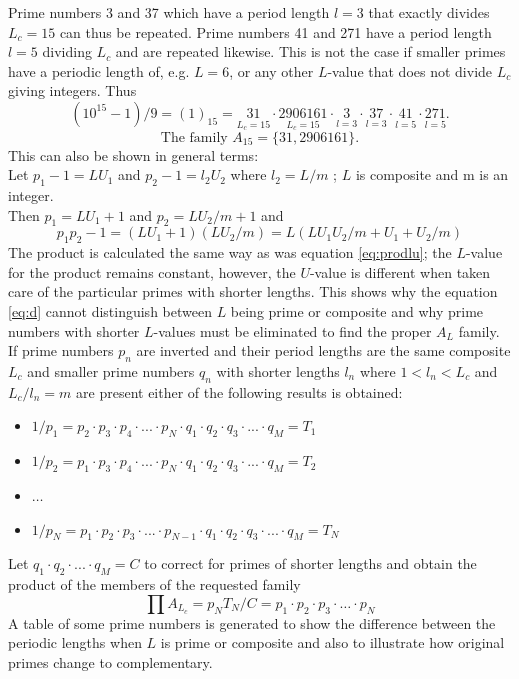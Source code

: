 \documentclass[10pt,twoside,a4paper]{amsart}
\begin{document}
Prime numbers 3 and 37 which have a period length $l = 3$ that exactly divides $L_{c} = 15$ can thus be repeated. Prime numbers 41 and 271 have a period length $l = 5$ dividing $L_{c}$ and are repeated likewise. This is not the case if smaller primes have a periodic length of, e.g. $L = 6$, or any other $L$-value that does not divide $L_{c}$ giving integers. Thus
\begin{equation*}
(10^{15}-1)/9 = (1)_{15} = \underset{L_{c}=15}{31} \cdot \underset{L_{c}=15}{2906161} \cdot \underset{l=3}{3} \cdot \underset{l=3}{37} \cdot \underset{l=5}{41} \cdot \underset{l=5}{271}.
\end{equation*}
\begin{equation*}
\text{The family } A_{15} = \{31, 2906161\}.
\end{equation*}
This can also be shown in general terms:\\
Let $p_{1}-1 = LU_{1}$ and $p_{2}-1 = l_{2}U_{2}$ where $l_{2} = L/m$ ; $L$ is composite and m is an integer.\\
Then $p_{1} = LU_{1}+1$ and $p_{2} = LU_{2}/m + 1$ and
\begin{equation}
\label{eq:gencomp}
p_{1}p_{2} - 1 = (LU_{1} + 1)(LU_{2}/m) = L(LU_{1}U_{2}/m + U_{1} + U_{2}/m)
\end{equation}
The product is calculated the same way as was equation \ref{eq:prodlu}; the $L$-value for the product remains constant, however, the $U$-value is different when taken care of the particular primes with shorter lengths. This shows why the equation \ref{eq:d} cannot distinguish between $L$ being prime or composite and why prime numbers with shorter $L$-values must be eliminated to find the proper $A_{L}$ family. \\
If prime numbers $p_{n}$ are inverted and their period lengths are the same composite $L_{c}$ and smaller prime numbers $q_{n}$ with shorter lengths $l_{n}$ where $1<l_{n}<L_{c}$ and $L_{c}/l_{n} = m$ are present either of the following results is obtained:
\begin{itemize}
\item[] $1/p_{1} = p_{2}\cdot p_{3}\cdot p_{4}\cdot ...\cdot p_{N}\cdot q_{1}\cdot q_{2}\cdot q_{3}\cdot ...\cdot q_{M} = T_{1}$
\item[] $1/p_{2} = p_{1}\cdot p_{3}\cdot p_{4}\cdot ...\cdot p_{N}\cdot q_{1}\cdot q_{2}\cdot q_{3}\cdot ...\cdot q_{M} = T_{2}$
\item[] $\ldots$
\item[] $1/p_{N} = p_{1}\cdot p_{2}\cdot p_{3}\cdot ...\cdot p_{N-1}\cdot q_{1}\cdot q_{2}\cdot q_{3}\cdot ...\cdot q_{M} = T_{N}$
\end{itemize}
Let $q_{1}\cdot q_{2}\cdot ...\cdot q_{M} = C$ to correct for primes of shorter lengths and obtain the product of the members of the requested family
\begin{equation}
\label{eq:prodALc}
\prod{A_{L_{c}}} = p_{N}T_{N}/C = p_{1}\cdot p_{2}\cdot p_{3}\cdot \ldots \cdot p_{N}
\end{equation}
A table of some prime numbers is generated to show the difference between the periodic lengths when $L$ is prime or composite and also to illustrate how original primes change to complementary. 
\end{document}
